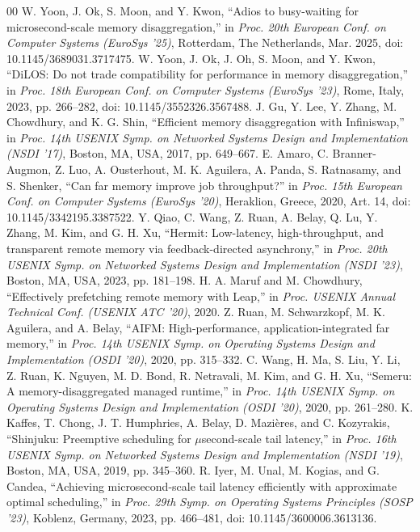 \documentclass[conference]{IEEEtran}
\begin{document}
\begin{thebibliography}{00}
 W. Yoon, J. Ok, S. Moon, and Y. Kwon, ``Adios to busy-waiting for microsecond-scale memory disaggregation,'' in \textit{Proc. 20th European Conf. on Computer Systems (EuroSys '25)}, Rotterdam, The Netherlands, Mar. 2025, doi: 10.1145/3689031.3717475.
 W. Yoon, J. Ok, J. Oh, S. Moon, and Y. Kwon, ``DiLOS: Do not trade compatibility for performance in memory disaggregation,'' in \textit{Proc. 18th European Conf. on Computer Systems (EuroSys '23)}, Rome, Italy, 2023, pp. 266--282, doi: 10.1145/3552326.3567488.
 J. Gu, Y. Lee, Y. Zhang, M. Chowdhury, and K. G. Shin, ``Efficient memory disaggregation with Infiniswap,'' in \textit{Proc. 14th USENIX Symp. on Networked Systems Design and Implementation (NSDI '17)}, Boston, MA, USA, 2017, pp. 649--667.
 E. Amaro, C. Branner-Augmon, Z. Luo, A. Ousterhout, M. K. Aguilera, A. Panda, S. Ratnasamy, and S. Shenker, ``Can far memory improve job throughput?'' in \textit{Proc. 15th European Conf. on Computer Systems (EuroSys '20)}, Heraklion, Greece, 2020, Art. 14, doi: 10.1145/3342195.3387522.
 Y. Qiao, C. Wang, Z. Ruan, A. Belay, Q. Lu, Y. Zhang, M. Kim, and G. H. Xu, ``Hermit: Low-latency, high-throughput, and transparent remote memory via feedback-directed asynchrony,'' in \textit{Proc. 20th USENIX Symp. on Networked Systems Design and Implementation (NSDI '23)}, Boston, MA, USA, 2023, pp. 181--198.
 H. A. Maruf and M. Chowdhury, ``Effectively prefetching remote memory with Leap,'' in \textit{Proc. USENIX Annual Technical Conf. (USENIX ATC '20)}, 2020.
 Z. Ruan, M. Schwarzkopf, M. K. Aguilera, and A. Belay, ``AIFM: High-performance, application-integrated far memory,'' in \textit{Proc. 14th USENIX Symp. on Operating Systems Design and Implementation (OSDI '20)}, 2020, pp. 315--332.
 C. Wang, H. Ma, S. Liu, Y. Li, Z. Ruan, K. Nguyen, M. D. Bond, R. Netravali, M. Kim, and G. H. Xu, ``Semeru: A memory-disaggregated managed runtime,'' in \textit{Proc. 14th USENIX Symp. on Operating Systems Design and Implementation (OSDI '20)}, 2020, pp. 261--280.
 K. Kaffes, T. Chong, J. T. Humphries, A. Belay, D. Mazi\`eres, and C. Kozyrakis, ``Shinjuku: Preemptive scheduling for $\mu$second-scale tail latency,'' in \textit{Proc. 16th USENIX Symp. on Networked Systems Design and Implementation (NSDI '19)}, Boston, MA, USA, 2019, pp. 345--360.
 R. Iyer, M. Unal, M. Kogias, and G. Candea, ``Achieving microsecond-scale tail latency efficiently with approximate optimal scheduling,'' in \textit{Proc. 29th Symp. on Operating Systems Principles (SOSP '23)}, Koblenz, Germany, 2023, pp. 466--481, doi: 10.1145/3600006.3613136.

\end{thebibliography}
\end{document}
